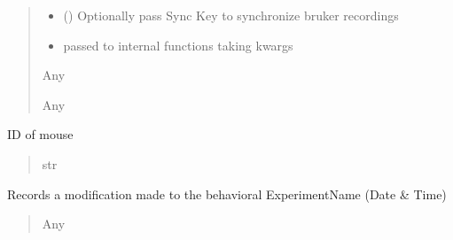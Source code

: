 \documentclass[letterpaper,10pt,english]{sphinxmanual}
\begin{document}
\begin{fulllineitems}
\begin{fulllineitems}
\begin{quote}
\begin{description}
\begin{itemize}
\item {} 
\sphinxAtStartPar
{} (\sphinxstyleliteralemphasis{\sphinxupquote{{[}}}\sphinxstyleliteralemphasis{\sphinxupquote{, }}\sphinxstyleliteralemphasis{\sphinxupquote{{]}}}) \textendash{} Optionally pass Sync Key to synchronize bruker recordings

\item {} 
\sphinxAtStartPar
{} \textendash{} passed to internal functions taking kwargs

\end{itemize}

\sphinxAtStartPar
Any

\sphinxAtStartPar
Any

\end{description}\end{quote}

\end{fulllineitems}


\begin{fulllineitems}
\label{\detokenize{Organization:Organization.Experiment.mouse_id}}
\pysigstartsignatures
{}
\pysigstopsignatures
\sphinxAtStartPar
ID of mouse
\begin{quote}\begin{description}
\sphinxAtStartPar
str

\end{description}\end{quote}

\end{fulllineitems}


\begin{fulllineitems}
\label{\detokenize{Organization:Organization.Experiment.record_mod}}
\pysigstartsignatures
{}
\pysigstopsignatures
\sphinxAtStartPar
Records a modification made to the behavioral ExperimentName (Date \& Time)
\begin{quote}\begin{description}
\sphinxAtStartPar
Any


\end{description}
\end{quote}
\end{fulllineitems}
\end{fulllineitems}
\end{document}
